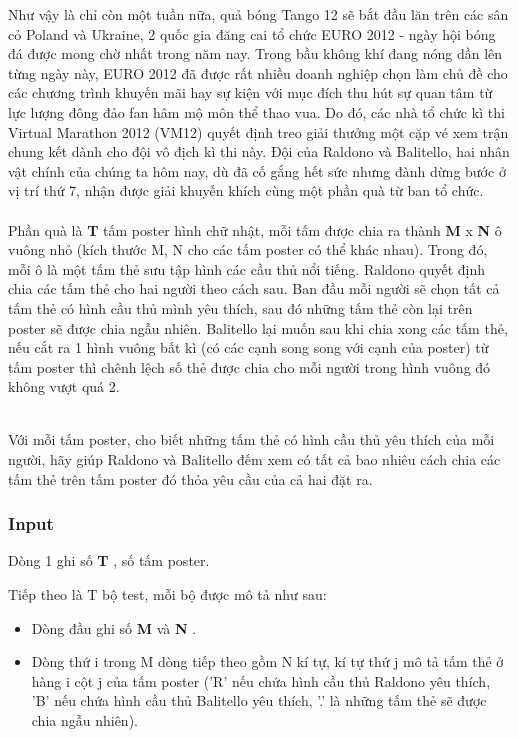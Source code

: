 

Như vậy là chỉ còn một tuần nữa, quả bóng Tango 12 sẽ bắt đầu lăn trên các sân cỏ Poland và Ukraine, 2 quốc gia đăng cai tổ chức EURO 2012 - ngày hội bóng đá được mong chờ nhất trong năm nay. Trong bầu không khí đang nóng dần lên từng ngày này, EURO 2012 đã được rất nhiều doanh nghiệp chọn làm chủ đề cho các chương trình khuyến mãi hay sự kiện với mục đích thu hút sự quan tâm từ lực lượng đông đảo fan hâm mộ môn thể thao vua. Do đó, các nhà tổ chức kì thi Virtual Marathon 2012 (VM12) quyết định treo giải thưởng một cặp vé xem trận chung kết dành cho đội vô địch kì thi này. Đội của Raldono và Balitello, hai nhân vật chính của chúng ta hôm nay, dù đã cố gắng hết sức nhưng đành dừng bước ở vị trí thứ 7, nhận được giải khuyến khích cùng một phần quà từ ban tổ chức.
\\
\\Phần quà là \textbf{ T } tấm poster hình chữ nhật, mỗi tấm được chia ra thành \textbf{ M } x \textbf{ N } ô vuông nhỏ (kích thước M, N cho các tấm poster có thể khác nhau). Trong đó, mỗi ô là một tấm thẻ sưu tập hình các cầu thủ nổi tiếng. Raldono quyết định chia các tấm thẻ cho hai người theo cách sau. Ban đầu mỗi người sẽ chọn tất cả tấm thẻ có hình cầu thủ mình yêu thích, sau đó những tấm thẻ còn lại trên poster sẽ được chia ngẫu nhiên. Balitello lại muốn sau khi chia xong các tấm thẻ, nếu cắt ra 1 hình vuông bất kì (có các cạnh song song với cạnh của poster) từ tấm poster thì chênh lệch số thẻ được chia cho mỗi người trong hình vuông đó không vượt quá 2.


\\Với mỗi tấm poster, cho biết những tấm thẻ có hình cầu thủ yêu thích của mỗi người, hãy giúp Raldono và Balitello đếm xem có tất cả bao nhiêu cách chia các tấm thẻ trên tấm poster đó thỏa yêu cầu của cả hai đặt ra.

\subsubsection{Input}

Dòng 1 ghi số \textbf{ T } , số tấm poster.

Tiếp theo là T bộ test, mỗi bộ được mô tả như sau:
\begin{itemize}
	\item Dòng đầu ghi số \textbf{ M } và \textbf{ N } .
\end{itemize}
\begin{itemize}
	\item Dòng thứ i trong M dòng tiếp theo gồm N kí tự, kí tự thứ j mô tả tấm thẻ ở hàng i cột j của tấm poster ('R' nếu chứa hình cầu thủ Raldono yêu thích, 'B' nếu chứa hình cầu thủ Balitello yêu thích, '.' là những tấm thẻ sẽ được chia ngẫu nhiên).
\end{itemize}

